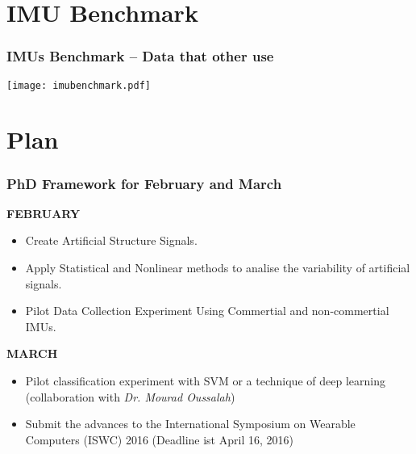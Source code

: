 \documentclass{beamer}
\begin{document}
% 





\section{IMU Benchmark}

\begin{frame}
\frametitle{IMUs Benchmark -- Data that other use}
\vspace{-0.7cm}


\hspace*{-25mm} \texttt{[image: imubenchmark.pdf]} 

   

\end{frame}






\section{Plan}

\begin{frame}
\frametitle{PhD Framework for February and March}
\vspace{-0.7cm}


\textbf{FEBRUARY}
    \begin{itemize}
    \item Create Artificial Structure Signals.
    \item Apply Statistical and Nonlinear methods to analise the variability of artificial signals.
    \item Pilot Data Collection Experiment Using Commertial and non-commertial IMUs.
    \end{itemize}
\textbf{MARCH}    
    \begin{itemize}
    \item Pilot classification experiment with SVM or a technique of deep learning \\ (collaboration with \textit{Dr. Mourad Oussalah})
    \item Submit the advances to the International Symposium on Wearable Computers (ISWC) 2016 (Deadline ist April 16, 2016)
    \end{itemize}    
    

\end{frame}
\end{document}
